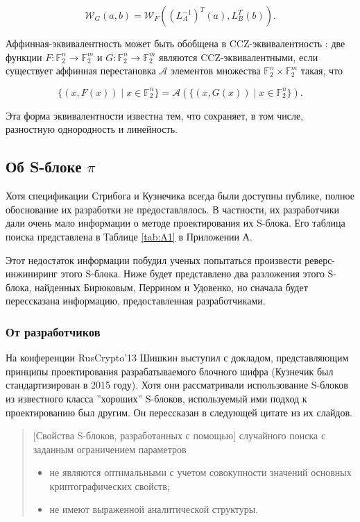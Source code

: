 \[
\mathcal{W}_G(a, b) = \mathcal{W}_F((L_A^{-1})^T(a), L_B^T(b)).
\]

Аффинная-эквивалентность может быть обобщена в CCZ-эквивалентность \cite{CCZ98}: две функции \( F: \mathbb{F}_2^n \rightarrow \mathbb{F}_2^m \) и \( G: \mathbb{F}_2^n \rightarrow \mathbb{F}_2^m \) являются CCZ-эквивалентными, если существует аффинная перестановка \( \mathcal{A} \) элементов множества \(\mathbb{F}_2^n \times \mathbb{F}_2^m\) такая, что

\[
\{(x, F(x)) \mid x \in \mathbb{F}_2^n \} = \mathcal{A}(\{(x, G(x)) \mid x \in \mathbb{F}_2^n \}).
\]

Эта форма эквивалентности известна тем, что сохраняет, в том числе, разностную однородность и линейность.

\subsection{Об S-блоке \(\pi\)}

Хотя спецификации Стрибога и Кузнечика всегда были доступны публике, полное обоснование их разработки не предоставлялось. В частности, их разработчики дали очень мало информации о методе проектирования их S-блока. Его таблица поиска представлена в Таблице \ref{tab:A1} в Приложении А.

Этот недостаток информации побудил ученых попытаться произвести реверс-инжиниринг этого S-блока. Ниже будет представлено два разложения этого S-блока, найденных Бирюковым, Перрином и Удовенко, но сначала будет перессказана информацию, предоставленная разработчиками.

\subsubsection{От разработчиков}

На конференции RusCrypto'13 \cite{Shi13} Шишкин выступил с докладом, представляющим принципы проектирования разрабатываемого блочного шифра (Кузнечик был стандартизирован в 2015 году). Хотя они рассматривали использование S-блоков из известного класса ''хороших'' S-блоков, используемый ими подход к проектированию был другим. Он перессказан в следующей цитате из их слайдов.

\begin{quote}
[Свойства S-блоков, разработанных с помощью] случайного поиска с заданным ограничением параметров
\begin{itemize}
        \item не являются оптимальными с учетом совокупности значений основных криптографических свойств;
        \item не имеют выраженной аналитической структуры.
\end{itemize}
\end{quote}

